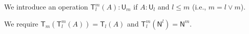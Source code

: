 \documentclass[11pt,a4paper]{article}
\theoremstyle{definition}
\newcommand{\NN}{\mathsf{N}}
\newcommand{\UU}{\mathsf{U}}
\newcommand{\mypi}[3]{\Pi_{#1:#2}#3}
\newcommand{\mylam}[3]{\lambda_{#1:#2}#3}
\newcommand{\mysig}[3]{\Sigma_{#1:#2}#3}
\newcommand{\T}{\mathsf{T}}
\begin{document}



We introduce an operation $\T_{l}^{m}(A):\UU_{m}$ if $A:\UU_{l}$
and $l\leqslant m$ (i.e., $m = l\vee m$).

We require $\T_{m}(\T_{l}^{m}(A)) = \T_{l}(A)$
and $\T_{l}^{m}(\NN^{l}) = \NN^{m}$.
\end{document}
